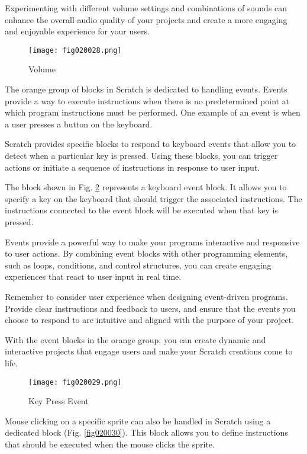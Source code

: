Experimenting with different volume settings and combinations of sounds can enhance the overall audio quality of your projects and create a more engaging and enjoyable experience for your users.

\begin{figure}[H]
   \centering
   \texttt{[image: fig020028.png]}
   \caption{Volume}
\label{fig020028}
\end{figure}

The orange group of blocks in Scratch is dedicated to handling events. Events provide a way to execute instructions when there is no predetermined point at which program instructions must be performed. One example of an event is when a user presses a button on the keyboard.

Scratch provides specific blocks to respond to keyboard events that allow you to detect when a particular key is pressed. Using these blocks, you can trigger actions or initiate a sequence of instructions in response to user input.

The block shown in Fig. \ref{fig020029} represents a keyboard event block. It allows you to specify a key on the keyboard that should trigger the associated instructions. The instructions connected to the event block will be executed when that key is pressed.

Events provide a powerful way to make your programs interactive and responsive to user actions. By combining event blocks with other programming elements, such as loops, conditions, and control structures, you can create engaging experiences that react to user input in real time.

Remember to consider user experience when designing event-driven programs. Provide clear instructions and feedback to users, and ensure that the events you choose to respond to are intuitive and aligned with the purpose of your project.

With the event blocks in the orange group, you can create dynamic and interactive projects that engage users and make your Scratch creations come to life.

\begin{figure}[H]
   \centering
   \texttt{[image: fig020029.png]}
   \caption{Key Press Event}
\label{fig020029}
\end{figure}

Mouse clicking on a specific sprite can also be handled in Scratch using a dedicated block (Fig. \ref{fig020030}). This block allows you to define instructions that should be executed when the mouse clicks the sprite.

